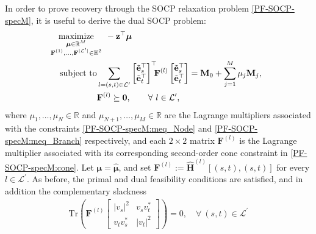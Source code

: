 \documentclass[journal,twoside]{IEEEtran}
\newcommand{\Tr}{\mathrm{Tr}}
\newcommand{\st}{\mathrm{subject~to}}
\newcommand{\bz}{\mathbf{z}}
\newcommand{\bH}{\mathbf{H}}
\newcommand{\bM}{\mathbf{M}}
\newcommand{\bmu}{\bm{\mu}}
\newcommand{\cL}{{\mathcal L}}
\DeclareMathOperator*{\maxi}{\mathrm{maximize}}
\begin{document}
In order to prove recovery through the SOCP relaxation problem \eqref{PF-SOCP-specM}, it is useful to derive the dual SOCP problem:
\begin{subequations}
	\begin{align}
	\hspace{-2mm}\maxi_{
	\begin{subarray}{c}
	\bmu \in \mathbb{R}^M\\
	\mathbf{F}^{(1)}, \ldots,
	\mathbf{F}^{|\mathcal{L}^{\prime}|} \in \mathbb{H}^2\\
	\end{subarray}
	} \hspace{-2mm}& \quad -\bz^{\top}\bmu \\
	\st  &%
	\sum_{
		l=(s,t)\in\mathcal{L}^{\prime}
		} {
		\begin{bmatrix}
		\tilde{\mathbf{e}}_{s}^{\top}\\
		\tilde{\mathbf{e}}_{t}^{\top}
		\end{bmatrix}^{\top}
		\!\!\!\mathbf{F}^{(l)}
		\begin{bmatrix}
		\tilde{\mathbf{e}}_{s}^{\top}\\
		\tilde{\mathbf{e}}_{t}^{\top}
		\end{bmatrix}}=\bM_0 + \sum_{j = 1}^M \mu_j\bM_j , \\
	\quad &
\mathbf{F}^{(l)}
	\succeq  \mathbf{0},\quad\quad\forall~l \in \cL^{\prime},
	\end{align}
\end{subequations}
where $\mu_1,\ldots,\mu_N\in\mathbb{R}$ and $\mu_{N+1},\ldots,\mu_{M}\in\mathbb{R}$ are the Lagrange multipliers associated with the constraints
\eqref{PF-SOCP-specM:meq_Node} and \eqref{PF-SOCP-specM:meq_Branch} respectively, and each $2\times2$ matrix $\mathbf{F}^{(l)}$
is the Lagrange multiplier associated with its corresponding second-order cone constraint in \eqref{PF-SOCP-specM:cone}.
Let $\bmu = \hat{\bmu}$, and set $\mathbf{F}^{(l)}:=\widehat{\mathbf{H}}^{(l)}[(s,t),(s,t)]$ for every $l\in\mathcal{L}^{\prime}$.
As before, the primal and dual feasibility conditions are satisfied, and in addition the complementary slackness
\begin{align}
\Tr\left(\mathbf{F}^{(l)}
\begin{bmatrix}
|v_s|^2 & v_s v^{\ast}_t\\
v_t v^{\ast}_s & |v_t|^2
\end{bmatrix}
\right)= 0,
\quad\forall~(s,t) \in \cL^{\prime}
\end{align}
\end{document}
